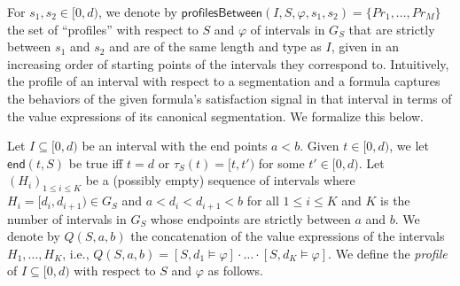 For $s_1, s_2 \in [0,d)$, we denote by $\mathsf{profilesBetween}(I, S, \varphi, s_1, s_2) = \{\textit{Pr}_1, \ldots, \textit{Pr}_M\}$ the set of ``profiles'' with respect to $S$ and $\varphi$ of intervals in $G_S$ that are strictly between $s_1$ and $s_2$ and are of the same length and type as $I$, given in an increasing order of starting points of the intervals they correspond to.
Intuitively, the profile of an interval with respect to a segmentation and a formula captures the behaviors of the given formula's satisfaction signal in that interval in terms of the value expressions of its canonical segmentation.
We formalize this below.

Let $I \subseteq [0,d)$ be an interval with the end points $a < b$.
Given $t \in [0,d)$, we let $\mathsf{end}(t, S)$ be true iff $t=d$ or $\tau_S(t) = [t, t')$ for some $t' \in [0,d)$.
Let $(H_i)_{1 \leq i \leq K}$ be a (possibly empty) sequence of intervals where $H_i = [d_i, d_{i+1}) \in G_S$ and $a < d_i < d_{i+1} < b$ for all $1 \leq i \leq K$ and $K$ is the number of intervals in $G_S$ whose endpoints are strictly between $a$ and $b$.
We denote by $Q(S, a, b)$ the concatenation of the value expressions of the intervals $H_1, \ldots, H_K$, i.e., $Q(S, a, b) = [S, d_1 \models \varphi] \cdot \ldots \cdot [S, d_K \models \varphi]$.
We define the \emph{profile} of $I \subseteq [0,d)$ with respect to $S$ and $\varphi$ as follows.

